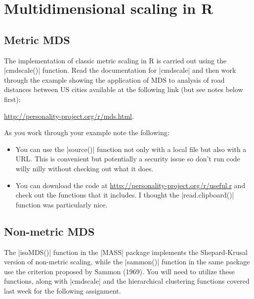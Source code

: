 \section{Multidimensional scaling in R}

\subsection{Metric MDS}

The implementation of classic metric scaling in R is carried out using the |cmdscale()| function. Read the documentation for |cmdscale| and then work through the example showing the application of MDS to analysis of road distances between US cities available at the following link (but see notes below first):

\href{http://personality-project.org/r/mds.html}{http://personality-project.org/r/mds.html}.

\medskip
As you work through your example note the following:

\begin{itemize}
\item You can use the |source()| function not only with a local file but also with a URL.  This is convenient but potentially a security issue so don't run code willy nilly without checking out what it does.

\item You can download the code at \href{http://personality-project.org/r/useful.r}{http://personality-project.org/r/useful.r} and check out the functions that it includes. I thought the |read.clipboard()| function was particularly nice.
\end{itemize}





\subsection{Non-metric MDS}

The |isoMDS()| function in the |MASS| package implements the Shepard-Krusal version of non-metric scaling, while the |sammon()| function in the same package use the criterion proposed by Sammon (1969). You will need to utilize these functions, along with |cmdscale| and the hierarchical clustering functions covered last week for the following assignment.

